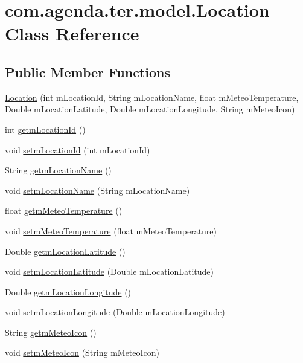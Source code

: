 \hypertarget{classcom_1_1agenda_1_1ter_1_1model_1_1_location}{\section{com.\-agenda.\-ter.\-model.\-Location Class Reference}
\label{classcom_1_1agenda_1_1ter_1_1model_1_1_location}
}
\subsection*{Public Member Functions}
\begin{DoxyCompactItemize}
\item 
\hyperlink{classcom_1_1agenda_1_1ter_1_1model_1_1_location_a14a2b2d4b341b1795e235840afc26f15}{Location} (int m\-Location\-Id, String m\-Location\-Name, float m\-Meteo\-Temperature, Double m\-Location\-Latitude, Double m\-Location\-Longitude, String m\-Meteo\-Icon)
\item 
int \hyperlink{classcom_1_1agenda_1_1ter_1_1model_1_1_location_a7932f06dbdbea6872dd1c22986486e8e}{getm\-Location\-Id} ()
\item 
void \hyperlink{classcom_1_1agenda_1_1ter_1_1model_1_1_location_a2760f14356b45113f052fbcd6e40adaf}{setm\-Location\-Id} (int m\-Location\-Id)
\item 
String \hyperlink{classcom_1_1agenda_1_1ter_1_1model_1_1_location_affba53edd32d32dc0cecac0fc75680c4}{getm\-Location\-Name} ()
\item 
void \hyperlink{classcom_1_1agenda_1_1ter_1_1model_1_1_location_a21fc5ab86136dab00da0b3989231ded1}{setm\-Location\-Name} (String m\-Location\-Name)
\item 
float \hyperlink{classcom_1_1agenda_1_1ter_1_1model_1_1_location_a25d8122624c603e4f8770fd9319ae4b1}{getm\-Meteo\-Temperature} ()
\item 
void \hyperlink{classcom_1_1agenda_1_1ter_1_1model_1_1_location_ad7014c0e2b43d332c53c54e686c3e676}{setm\-Meteo\-Temperature} (float m\-Meteo\-Temperature)
\item 
Double \hyperlink{classcom_1_1agenda_1_1ter_1_1model_1_1_location_ad05e2af25eff442580bb61e2d2ed0708}{getm\-Location\-Latitude} ()
\item 
void \hyperlink{classcom_1_1agenda_1_1ter_1_1model_1_1_location_af5c88e91ee55b8db214972a3d440dafa}{setm\-Location\-Latitude} (Double m\-Location\-Latitude)
\item 
Double \hyperlink{classcom_1_1agenda_1_1ter_1_1model_1_1_location_a25221162ebd579b9d90bbba677935dc7}{getm\-Location\-Longitude} ()
\item 
void \hyperlink{classcom_1_1agenda_1_1ter_1_1model_1_1_location_ae3b1c09a5d6e990a6b9d709daab05300}{setm\-Location\-Longitude} (Double m\-Location\-Longitude)
\item 
String \hyperlink{classcom_1_1agenda_1_1ter_1_1model_1_1_location_af0e326971c129544a72de5e25b11b807}{getm\-Meteo\-Icon} ()
\item 
void \hyperlink{classcom_1_1agenda_1_1ter_1_1model_1_1_location_a84689fcc7f0ae573baef72e4c2c312b8}{setm\-Meteo\-Icon} (String m\-Meteo\-Icon)
\end{DoxyCompactItemize}



